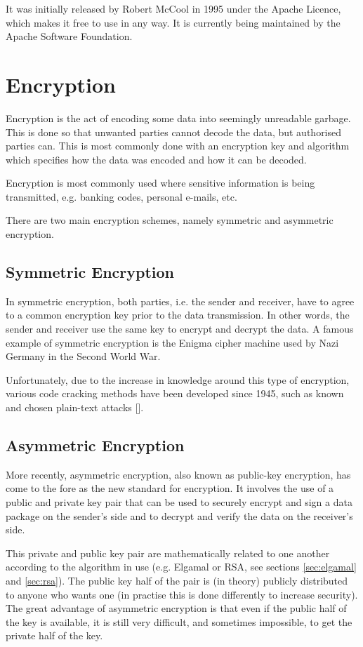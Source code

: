It was initially released by Robert McCool in 1995 under the Apache Licence, which makes it
free to use in any way. It is currently being maintained by the Apache Software Foundation. 

\section{Encryption}

Encryption is the act of encoding some data into seemingly unreadable garbage. This is done so
that unwanted parties cannot decode the data, but authorised parties can. This is most commonly
done with an encryption key and algorithm which specifies how the data was encoded and how it
can be decoded.

Encryption is most commonly used where sensitive information is being transmitted, e.g. banking
codes, personal e-mails, etc.

There are two main encryption schemes, namely symmetric and asymmetric encryption. 

\subsection{Symmetric Encryption}

In symmetric encryption, both parties, i.e. the sender and receiver, have to agree to a common
encryption key prior to the data transmission. In other words, the sender and receiver use the
same key to encrypt and decrypt the data. A famous example of symmetric encryption is the
Enigma cipher machine used by Nazi Germany in the Second World War. 

Unfortunately, due to the increase in knowledge around this type of encryption, various code
cracking methods have been developed since 1945, such as known and chosen plain-text attacks
[\cite{website:cipher-attacks}].

\subsection{Asymmetric Encryption}

More recently, asymmetric encryption, also known as public-key encryption, has come to the fore
as the new standard for encryption. It involves the use of a public and private key pair that
can be used to securely encrypt and sign a data package on the sender's side and to decrypt
and verify the data on the receiver's side.

This private and public key pair are mathematically related to one another according to the
algorithm in use (e.g. Elgamal or RSA, see sections \ref{sec:elgamal} and \ref{sec:rsa}). The
public key half of the pair is (in theory) publicly distributed to anyone who wants one (in
practise this is done differently to increase security). The great advantage of asymmetric
encryption is that even if the public half of the key is available, it is still very difficult,
and sometimes impossible, to get the private half of the key.

